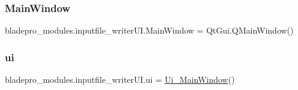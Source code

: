 \hypertarget{namespacebladepro__modules_1_1inputfile__writer_u_i_ab649489a40967421c06970ba9ffeef53}{}\label{namespacebladepro__modules_1_1inputfile__writer_u_i_ab649489a40967421c06970ba9ffeef53} 
\subsubsection{\texorpdfstring{Main\+Window}{MainWindow}}
{\footnotesize\ttfamily bladepro\+\_\+modules.\+inputfile\+\_\+writer\+U\+I.\+Main\+Window = Qt\+Gui.\+Q\+Main\+Window()}

\hypertarget{namespacebladepro__modules_1_1inputfile__writer_u_i_ad10cb13360f604c82c202259b73f747b}{}\label{namespacebladepro__modules_1_1inputfile__writer_u_i_ad10cb13360f604c82c202259b73f747b} 
\subsubsection{\texorpdfstring{ui}{ui}}
{\footnotesize\ttfamily bladepro\+\_\+modules.\+inputfile\+\_\+writer\+U\+I.\+ui = \hyperlink{classbladepro__modules_1_1inputfile__writer_u_i_1_1_ui___main_window}{Ui\+\_\+\+Main\+Window}()}

